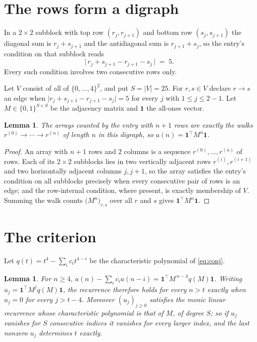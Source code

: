 \documentclass[11pt,a4paper]{article}
\theoremstyle{plain}
\newtheorem{lemma}[theorem]{Lemma}
\theoremstyle{definition}
\begin{document}
\section{The rows form a digraph}

In a $2\times2$ subblock with top row $(r_j,r_{j+1})$ and bottom row $(s_j,s_{j+1})$ the
diagonal sum is $r_j+s_{j+1}$ and the antidiagonal sum is $r_{j+1}+s_j$, so the entry's
condition on that subblock reads
\[
\bigl|\,r_j+s_{j+1}-r_{j+1}-s_j\,\bigr|\;=\;5.
\]
Every such condition involves two consecutive rows only.

Let $V$ consist of all of $\{0,\dots,4\}^{2}$, and put $S=|V|=25$. For $r,s\in V$ declare $r\to s$ an edge
when $\bigl|r_j+s_{j+1}-r_{j+1}-s_j\bigr|=5$ for every $j$ with
$1\le j\le2-1$. Let $M\in\{0,1\}^{S\times S}$ be the adjacency matrix and $\mathbf{1}$
the all-ones vector.

\begin{lemma}\label{lem:walk}
The arrays counted by the entry with $n+1$ rows are exactly the walks
$r^{(0)}\to\cdots\to r^{(n)}$ of length $n$ in this digraph, so
$a(n)=\mathbf{1}^{\!\top}M^{n}\mathbf{1}$.
\end{lemma}

\begin{proof}
An array with $n+1$ rows and $2$ columns is a sequence $r^{(0)},\dots,r^{(n)}$ of
rows. Each of its $2\times2$ subblocks lies in two vertically adjacent rows
$r^{(i)},r^{(i+1)}$ and two horizontally adjacent columns $j,j+1$, so the array satisfies
the entry's condition on all subblocks precisely when every consecutive pair of rows is an
edge; and the row-internal condition, where present, is exactly membership of $V$. Summing
the walk counts $\bigl(M^{n}\bigr)_{r,s}$ over all $r$ and $s$ gives
$\mathbf{1}^{\!\top}M^{n}\mathbf{1}$.
\end{proof}

\section{The criterion}

Let $q(t)=t^{4}-\sum_i c_i t^{4-i}$ be the characteristic polynomial of
\eqref{eq:conj}.

\begin{lemma}\label{lem:crit}
For $n\ge4$,
$a(n)-\sum_i c_i a(n-i)=\mathbf{1}^{\!\top}M^{\,n-4}q(M)\mathbf{1}$. Writing
$u_j=\mathbf{1}^{\!\top}M^{j}q(M)\mathbf{1}$, the recurrence therefore holds for every
$n>t$ exactly when $u_j=0$ for every $j>t-4$. Moreover $(u_j)_{j\ge0}$ satisfies the
monic linear recurrence whose characteristic polynomial is that of $M$, of degree $S$; so
if $u_j$ vanishes for $S$ consecutive indices it vanishes for every larger index, and the
last nonzero $u_j$ determines $t$ exactly.
\end{lemma}
\end{document}

